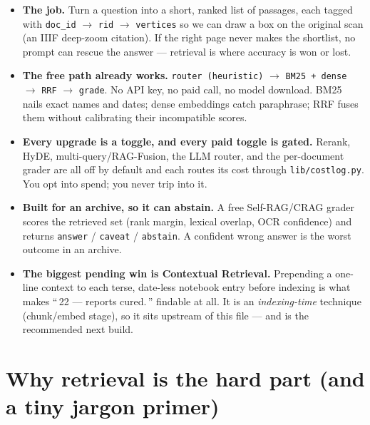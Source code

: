 \documentclass[11pt]{article}
\newcommand{\code}[1]{\texttt{#1}}
\newcommand{\file}[1]{\texttt{#1}}
\begin{document}
\begin{tldrbox}
\begin{itemize}[leftmargin=*]
  \item \textbf{The job.} Turn a question into a short, ranked list of passages, each tagged with
        \code{doc\_id} $\to$ \code{rid} $\to$ \code{vertices} so we can draw a box on the original
        scan (an IIIF deep-zoom citation). If the right page never makes the shortlist, no prompt can
        rescue the answer --- retrieval is where accuracy is won or lost.
  \item \textbf{The free path already works.}
        \code{router (heuristic)} $\to$ \code{BM25 + dense} $\to$ \code{RRF} $\to$ \code{grade}.
        No API key, no paid call, no model download. BM25 nails exact names and dates; dense
        embeddings catch paraphrase; RRF fuses them without calibrating their incompatible scores.
  \item \textbf{Every upgrade is a toggle, and every paid toggle is gated.} Rerank, HyDE,
        multi-query/RAG-Fusion, the LLM router, and the per-document grader are all off by default
        and each routes its cost through \file{lib/costlog.py}. You opt into spend; you never trip
        into it.
  \item \textbf{Built for an archive, so it can abstain.} A free Self-RAG/CRAG grader scores the
        retrieved set (rank margin, lexical overlap, OCR confidence) and returns
        \code{answer} / \code{caveat} / \code{abstain}. A confident wrong answer is the worst
        outcome in an archive.
  \item \textbf{The biggest pending win is Contextual Retrieval.} Prepending a one-line context to
        each terse, date-less notebook entry before indexing is what makes ``\,22 --- reports
        cured.\,'' findable at all. It is an \emph{indexing-time} technique (chunk/embed stage), so
        it sits upstream of this file --- and is the recommended next build.
\end{itemize}
\end{tldrbox}

\section{Why retrieval is the hard part (and a tiny jargon primer)}
\end{document}
